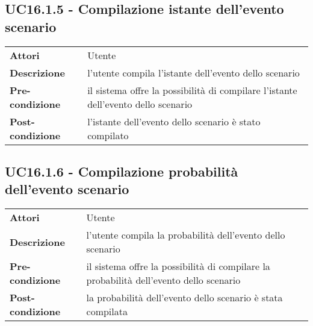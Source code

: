 \subsection{UC16.1.5 - Compilazione istante dell'evento scenario}
\label{sssec:UC16.1.5}
\def\arraystretch{1.5}
\begin{tabularx}{\textwidth}{l|p{}}
\rowcolor{I} \multicolumn{2}{c}{\color{white}\textbf{UC16.1.5 - Compilazione istante dell'evento scenario}} \\
\toprule
\endhead
\textbf{Attori} & Utente\\
\textbf{Descrizione} & l'utente compila l'istante dell'evento dello scenario\\
\textbf{Pre-condizione} & il sistema offre la possibilità di compilare l'istante dell'evento dello scenario\\
\textbf{Post-condizione} & l'istante dell'evento dello scenario è stato compilato\\
\bottomrule
\end{tabularx}
\subsection{UC16.1.6 - Compilazione probabilità dell'evento scenario}
\label{sssec:UC16.1.6}
\def\arraystretch{1.5}
\begin{tabularx}{\textwidth}{l|p{}}
\rowcolor{I} \multicolumn{2}{c}{\color{white}\textbf{UC16.1.6 - Compilazione probabilità dell'evento scenario}} \\
\toprule
\endhead
\textbf{Attori} & Utente\\
\textbf{Descrizione} & l'utente compila la probabilità dell'evento dello scenario\\
\textbf{Pre-condizione} & il sistema offre la possibilità di compilare la probabilità dell'evento dello scenario\\
\textbf{Post-condizione} & la probabilità dell'evento dello scenario è stata compilata\\
\bottomrule
\end{tabularx}
